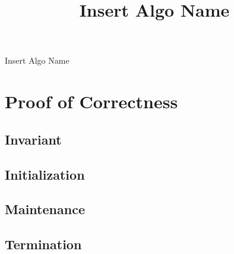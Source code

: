 \documentclass[10pt,a4paper]{article}
\title{Insert Algo Name}
\date{}
\begin{document}
\maketitle

\begin{algorithm}[H]
	\BlankLine
	\Begin {
	}
\caption{Insert Algo Name}
\end{algorithm}

\section{Proof of Correctness}
	\subsection{Invariant}

	\subsection{Initialization}

	\subsection{Maintenance}

	\subsection{Termination}
\end{document}
